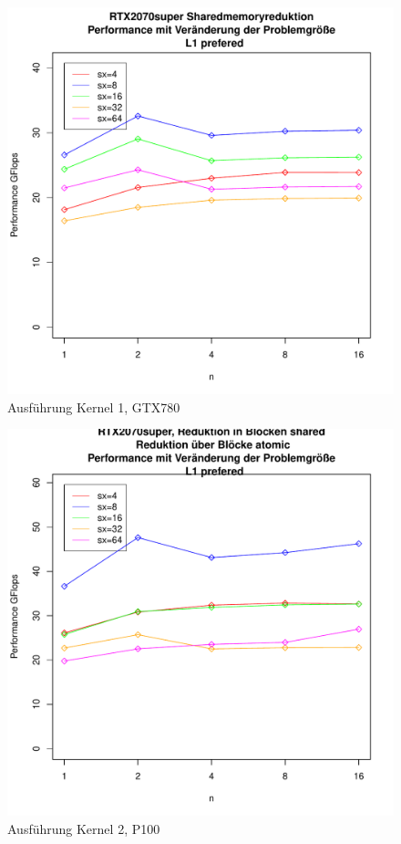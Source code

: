 \documentclass[10pt,a4paper]{article}
\begin{document}
	\begin{figure}
		\includegraphics[page=5,scale=0.8]{../Diagramme/allshared_changei.pdf}
		
		\caption{Ausführung Kernel 1, GTX780 }
		\label{Ausführung Kernel1, GTX780 }
	\end{figure}
	
	
	\begin{figure}
	\includegraphics[page=8,scale=0.8]{../Diagramme/sharedatomic_chagei.pdf}
	
	\caption{Ausführung Kernel 2, P100 }
	\label{Ausführung Kernel2, P100 }
	\end{figure}
\end{document}
